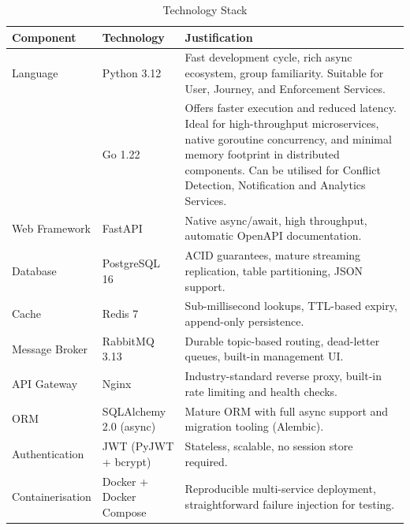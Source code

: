\documentclass[12pt,a4paper]{article}
\begin{document}
\begin{table}[H]
\centering
\small

\begin{tabularx}{\textwidth}{L{3cm} L{3.8cm} X}
  \toprule
  \textbf{Component} & \textbf{Technology} & \textbf{Justification} \\
  \midrule
  Language        & Python 3.12              & Fast development cycle, rich async ecosystem, group familiarity. Suitable for User, Journey, and Enforcement Services. \\
  \addlinespace[0.1cm]
         & Go 1.22                  & Offers faster execution and reduced latency. Ideal for high-throughput microservices, native goroutine concurrency, and minimal memory footprint in distributed components. Can be utilised for Conflict Detection, Notification and Analytics Services. \\
  \addlinespace[0.1cm]
  
  Web Framework   & FastAPI                  & Native async/await, high throughput, automatic OpenAPI documentation. \\
  \addlinespace[0.1cm]
  Database        & PostgreSQL 16            & ACID guarantees, mature streaming replication, table partitioning, JSON support. \\
  \addlinespace[0.1cm]
  Cache           & Redis 7                  & Sub-millisecond lookups, TTL-based expiry, append-only persistence. \\
  \addlinespace[0.1cm]
  Message Broker  & RabbitMQ 3.13            & Durable topic-based routing, dead-letter queues, built-in management UI. \\
  \addlinespace[0.1cm]
  API Gateway     & Nginx                    & Industry-standard reverse proxy, built-in rate limiting and health checks. \\
  \addlinespace[0.1cm]
  ORM             & SQLAlchemy 2.0 (async)   & Mature ORM with full async support and migration tooling (Alembic). \\
  \addlinespace[0.1cm]
  Authentication  & JWT (PyJWT + bcrypt)     & Stateless, scalable, no session store required. \\
  \addlinespace[0.1cm]
  Containerisation& Docker + Docker Compose  & Reproducible multi-service deployment, straightforward failure injection for testing. \\
  \bottomrule
\end{tabularx}
\caption{Technology Stack}
\end{table}
\end{document}
